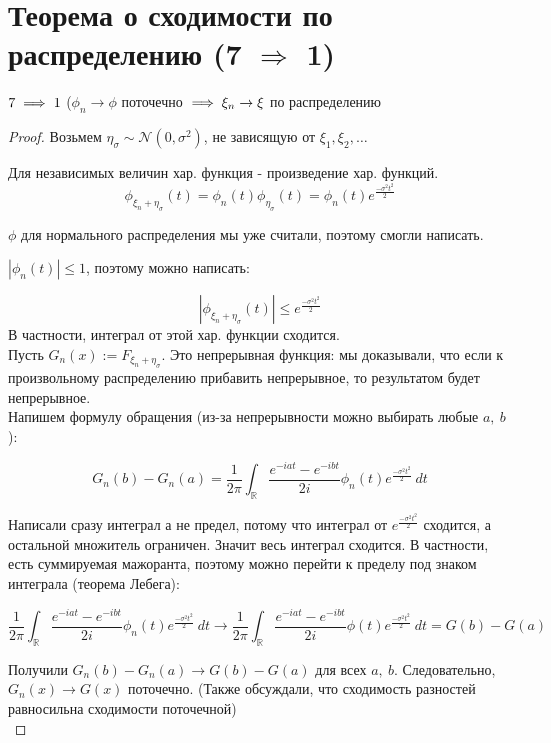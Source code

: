 \section{Теорема о сходимости по распределению (7 $\Rightarrow$ 1)}

\begin{theorem}
    $7 \implies 1$ ($\phi_n \to \phi$ поточечно $\implies \xi_n \to \xi$ по распределению
\end{theorem}

\begin{proof}
    Возьмем $\eta_\sigma \sim \mathcal{N}(0, \sigma^2)$, не зависящую от $\xi_1, \xi_2, \dots$\
    
    Для независимых величин хар. функция - произведение хар. функций.
    \[ 
       \phi_{\xi_n + \eta_\sigma}(t) = \phi_n(t) \phi_{\eta_\sigma}(t) = \phi_n(t)e^{\frac{-\sigma^2t^2}{2}}
    \]
    
    $\phi$ для нормального распределения мы уже считали, поэтому смогли написать.
    
    $|\phi_n(t)| \leq 1$, поэтому можно написать:
    
    \[|\phi_{\xi_n + \eta_\sigma}(t)| \leq e^{\frac{-\sigma^2t^2}{2}}\]
    В частности, интеграл от этой хар. функции сходится.\\
    
    Пусть $G_n(x) := F_{\xi_n + \eta_\sigma}$. Это непрерывная функция: мы доказывали, что если к произвольному распределению прибавить непрерывное, то результатом будет непрерывное.\\
    
    Напишем формулу обращения (из-за непрерывности можно выбирать любые $a,\ b$):
    
    \[ G_n(b) - G_n(a) = \frac{1}{2\pi} \int_{\mathbb{R}} \frac{e^{-iat}-e^{-ibt}}{2i}\phi_n(t) e^{\frac{-\sigma^2 t^2}{2}}\ dt \]
    
    Написали сразу интеграл а не предел, потому что интеграл от $e^\frac{-\sigma^2t^2}{2}$ сходится, а остальной множитель ограничен. Значит весь интеграл сходится. В частности, есть суммируемая мажоранта, поэтому можно перейти к пределу под знаком интеграла (теорема Лебега):
    
    \[
       \frac{1}{2\pi} \int_{\mathbb{R}} \frac{e^{-iat}-e^{-ibt}}{2i}\phi_n(t) e^{\frac{-\sigma^2 t^2}{2}}\ dt \to
       \frac{1}{2\pi} \int_{\mathbb{R}} \frac{e^{-iat}-e^{-ibt}}{2i}\phi(t) e^{\frac{-\sigma^2 t^2}{2}}\ dt = G(b) - G(a)
    \]
    
    Получили $G_n(b) - G_n(a) \to G(b) - G(a)$ для всех $a,\ b$. Следовательно, $G_n(x) \to G(x)$ поточечно. (Также обсуждали, что сходимость разностей равносильна сходимости поточечной)\\
    

\end{proof}
